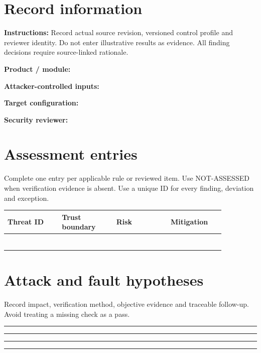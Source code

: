 \documentclass[10pt,letterpaper]{article}
\begin{document}
\makedoctitle
\makedocsummary
\section{Record information}
\textbf{Instructions:} Record actual source revision, versioned control profile and reviewer identity. Do not enter illustrative results as evidence. All finding decisions require source-linked rationale.\par\medskip
\noindent\textbf{Product / module:}\quad\hrulefill\par\vspace{11pt}
\noindent\textbf{Attacker-controlled inputs:}\quad\hrulefill\par\vspace{11pt}
\noindent\textbf{Target configuration:}\quad\hrulefill\par\vspace{11pt}
\noindent\textbf{Security reviewer:}\quad\hrulefill\par\vspace{11pt}
\section{Assessment entries}
Complete one entry per applicable rule or reviewed item. Use NOT-ASSESSED when verification evidence is absent. Use a unique ID for every finding, deviation and exception.\par\medskip
\begin{longtable}{|p{0.215\linewidth}|p{0.215\linewidth}|p{0.215\linewidth}|p{0.215\linewidth}|}
\hline
\textbf{Threat ID} & \textbf{Trust boundary} & \textbf{Risk} & \textbf{Mitigation}\\\hline
\endhead
\rule{0pt}{27pt} & & & \\\hline
\rule{0pt}{27pt} & & & \\\hline
\rule{0pt}{27pt} & & & \\\hline
\rule{0pt}{27pt} & & & \\\hline
\rule{0pt}{27pt} & & & \\\hline
\rule{0pt}{27pt} & & & \\\hline
\end{longtable}
\section{Attack and fault hypotheses}
Record impact, verification method, objective evidence and traceable follow-up. Avoid treating a missing check as a pass.\par\medskip
\noindent\rule{\linewidth}{0.4pt}\par\vspace{16pt}
\noindent\rule{\linewidth}{0.4pt}\par\vspace{16pt}
\noindent\rule{\linewidth}{0.4pt}\par\vspace{16pt}
\noindent\rule{\linewidth}{0.4pt}\par\vspace{16pt}
\end{document}
